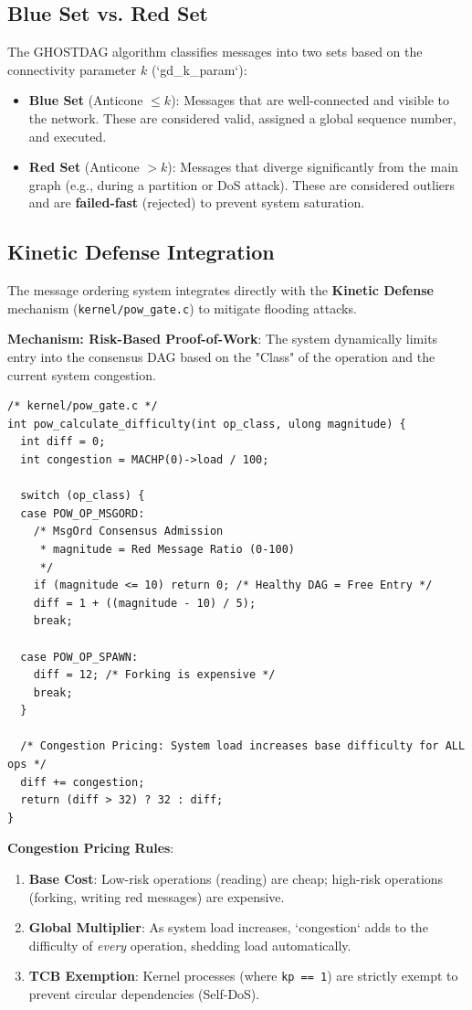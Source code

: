 \documentclass[11pt,letterpaper]{article}
\begin{document}
\subsection{Blue Set vs. Red Set}

The GHOSTDAG algorithm classifies messages into two sets based on the connectivity parameter $k$ (`gd_k_param`):

\begin{itemize}
\item \textbf{Blue Set} (Anticone $\le k$): Messages that are well-connected and visible to the network. These are considered valid, assigned a global sequence number, and executed.
\item \textbf{Red Set} (Anticone $> k$): Messages that diverge significantly from the main graph (e.g., during a partition or DoS attack). These are considered outliers and are \textbf{failed-fast} (rejected) to prevent system saturation.
\end{itemize}

\subsection{Kinetic Defense Integration}

The message ordering system integrates directly with the \textbf{Kinetic Defense} mechanism (\texttt{kernel/pow_gate.c}) to mitigate flooding attacks.

\textbf{Mechanism: Risk-Based Proof-of-Work}:
The system dynamically limits entry into the consensus DAG based on the "Class" of the operation and the current system congestion.

\begin{lstlisting}
/* kernel/pow_gate.c */
int pow_calculate_difficulty(int op_class, ulong magnitude) {
  int diff = 0;
  int congestion = MACHP(0)->load / 100;

  switch (op_class) {
  case POW_OP_MSGORD:
    /* MsgOrd Consensus Admission
     * magnitude = Red Message Ratio (0-100)
     */
    if (magnitude <= 10) return 0; /* Healthy DAG = Free Entry */
    diff = 1 + ((magnitude - 10) / 5);
    break;
    
  case POW_OP_SPAWN: 
    diff = 12; /* Forking is expensive */
    break;
  }

  /* Congestion Pricing: System load increases base difficulty for ALL ops */
  diff += congestion;
  return (diff > 32) ? 32 : diff;
}
\end{lstlisting}

\textbf{Congestion Pricing Rules}:
\begin{enumerate}
    \item \textbf{Base Cost}: Low-risk operations (reading) are cheap; high-risk operations (forking, writing red messages) are expensive.
    \item \textbf{Global Multiplier}: As system load increases, `congestion` adds to the difficulty of \textit{every} operation, shedding load automatically.
    \item \textbf{TCB Exemption}: Kernel processes (where \texttt{kp == 1}) are strictly exempt to prevent circular dependencies (Self-DoS).
\end{enumerate}
\end{document}
